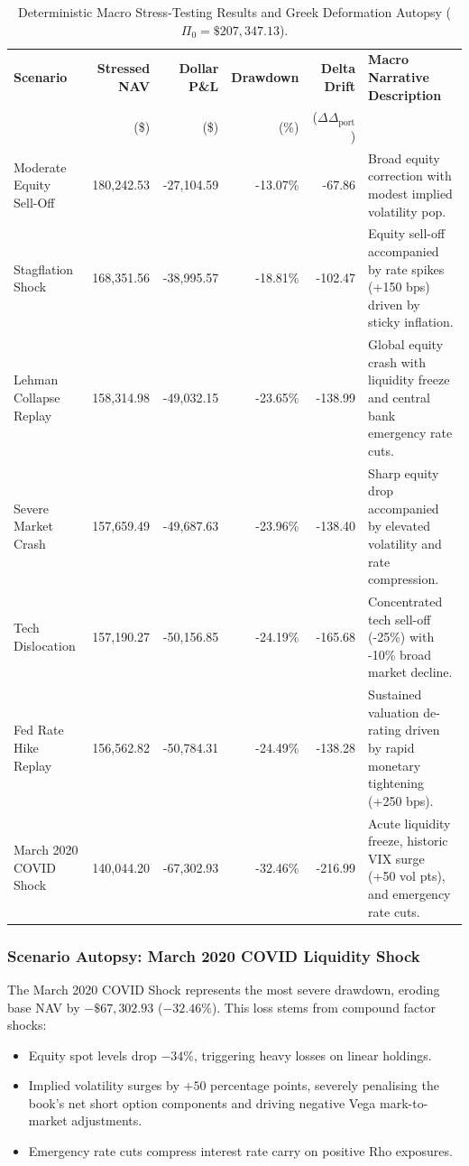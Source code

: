 \documentclass{article}
\theoremstyle{plain}
\theoremstyle{definition}
\theoremstyle{remark}
\begin{document}
\begin{table}[htbp]
\centering
\footnotesize %
\setlength{\tabcolsep}{3.5pt} %
\caption{Deterministic Macro Stress-Testing Results and Greek Deformation Autopsy ($\Pi_0 = \$207,347.13$).}
\label{tab:stress_results}
\begin{tabularx}{\textwidth}{@{} l r r r r >{\raggedright\arraybackslash}X @{}}
\toprule
\textbf{Scenario} & \textbf{Stressed NAV} & \textbf{Dollar P\&L} & \textbf{Drawdown} & \textbf{Delta Drift} & \textbf{Macro Narrative Description} \\
 & (\$) & (\$) & (\%) & ($\Delta \Delta_{\text{port}}$) & \\
\midrule
Moderate Equity Sell-Off & 180,242.53 & -27,104.59 & -13.07\% & -67.86 & Broad equity correction with modest implied volatility pop. \\
\addlinespace
Stagflation Shock & 168,351.56 & -38,995.57 & -18.81\% & -102.47 & Equity sell-off accompanied by rate spikes (+150 bps) driven by sticky inflation. \\
\addlinespace
2008 Lehman Collapse Replay & 158,314.98 & -49,032.15 & -23.65\% & -138.99 & Global equity crash with liquidity freeze and central bank emergency rate cuts. \\
\addlinespace
Severe Market Crash & 157,659.49 & -49,687.63 & -23.96\% & -138.40 & Sharp equity drop accompanied by elevated volatility and rate compression. \\
\addlinespace
Tech Dislocation & 157,190.27 & -50,156.85 & -24.19\% & -165.68 & Concentrated tech sell-off (-25\%) with -10\% broad market decline. \\
\addlinespace
2022 Fed Rate Hike Replay & 156,562.82 & -50,784.31 & -24.49\% & -138.28 & Sustained valuation de-rating driven by rapid monetary tightening (+250 bps). \\
\addlinespace
March 2020 COVID Shock & 140,044.20 & -67,302.93 & -32.46\% & -216.99 & Acute liquidity freeze, historic VIX surge (+50 vol pts), and emergency rate cuts. \\
\bottomrule
\end{tabularx}
\end{table}

\subsubsection{Scenario Autopsy: March 2020 COVID Liquidity Shock}
The March 2020 COVID Shock represents the most severe drawdown, eroding base NAV by $-\$67,302.93$ ($-32.46\%$). This loss stems from compound factor shocks:
\begin{itemize}
    \item Equity spot levels drop $-34\%$, triggering heavy losses on linear holdings.
    \item Implied volatility surges by $+50$ percentage points, severely penalising the book's net short option components and driving negative Vega mark-to-market adjustments.
    \item Emergency rate cuts compress interest rate carry on positive Rho exposures.
\end{itemize}
\end{document}
